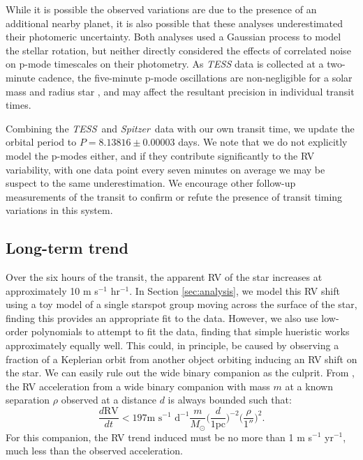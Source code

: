 \documentclass[twocolumn]{aastex63}
\newcommand{\tess}{{\it TESS}}
\newcommand{\spitz}{{\it Spitzer}}
\begin{document}
While it is possible the observed variations are due to the presence of an additional nearby planet, it is also possible that these analyses underestimated their photomeric uncertainty. 
Both analyses used a Gaussian process to model the stellar rotation, but neither directly considered the effects of correlated noise on p-mode timescales on their photometry. 
As \textit{TESS} data is collected at a two-minute cadence, the five-minute p-mode oscillations are non-negligible for a solar mass and radius star \citep{Chaplin13}, and may affect the resultant precision in individual transit times.


Combining the \tess\ and \spitz\ data with our own transit time, we update the orbital period to $P= 8.13816 \pm 0.00003$ days. 
We note that we do not explicitly model the p-modes either, and if they contribute significantly to the RV variability, with one data point every seven minutes on average we may be suspect to the same underestimation.
We encourage other follow-up measurements of the transit to confirm or refute the presence of transit timing variations in this system.


\subsection{Long-term trend}

Over the six hours of the transit, the apparent RV of the star increases at approximately 10 m s$^{-1}$ hr$^{-1}$. 
In Section \ref{sec:analysis}, we model this RV shift using a toy model of a single 
starspot group moving across the surface of the star, finding this provides an appropriate fit to the data. 
However, we also use low-order polynomials to attempt to fit the data, finding that simple hueristic works approximately equally well.
This could, in principle, be caused by observing a fraction of a Keplerian orbit from another object orbiting inducing an RV shift on the star. 
We can easily rule out the wide binary companion as the culprit.
From \citet{Liu02}, the RV acceleration from a wide binary companion with mass $m$ at a known separation $\rho$ observed at a distance $d$ is always bounded such that:
\begin{equation}
    \frac{d\textrm{RV}}{dt} < 197 \textrm{m } \textrm{s}^{-1} \textrm{ d}^{-1}
    \frac{m}{M_\odot} \bigg(\frac{d}{1\textrm{pc}}\bigg)^{-2} \bigg(\frac{\rho}{1''}\bigg)^{2}.
\end{equation}
For this companion, the RV trend induced must be no more than 1 m s$^{-1}$ yr$^{-1}$, much less than the observed acceleration.
\end{document}
